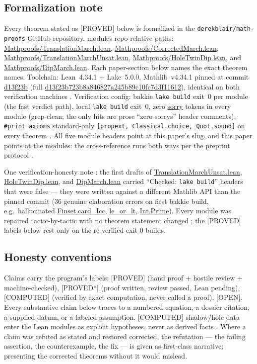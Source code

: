 \documentclass[11pt,a4paper]{article}
\theoremstyle{definition}
\begin{document}
\subsection{Formalization note}
\label{sec:formalization}

Every theorem stated as [PROVED] below is formalized in the
\texttt{derekblair/math-proofs} GitHub repository, modules
repo-relative paths:
\url{Mathproofs/TranslationMarch.lean},
\url{Mathproofs/CorrectedMarch.lean},
\url{Mathproofs/TranslationMarchUnsat.lean},
\url{Mathproofs/HoleTwinDip.lean}, and
\url{Mathproofs/DipMarch.lean}. Each paper-section below names the
exact theorem names. Toolchain: Lean~4.34.1 + Lake~5.0.0,
Mathlib~v4.34.1 pinned at commit \url{d13f23b}
(full \url{d13f23b723b8a846827a245b89c10fc7d3f11612}), identical on
both verification machines \cite{D246}. Verification config: bakkie
\texttt{lake build} exit~0 per module (the fast verdict path),
local \texttt{lake build} exit~0, zero \url{sorry} tokens in every
module (grep-clean; the only hits are prose ``zero sorrys'' header
comments), \texttt{\#print axioms} standard-only
\texttt{[propext, Classical.choice, Quot.sound]} on every theorem
\cite{D234,D246,D250,D262}. All five module headers point at this
paper's slug, and this paper points at the modules: the cross-reference
runs both ways per the preprint protocol \cite{D246}.

One verification-honesty note \cite{D246}: the first drafts of
\url{TranslationMarchUnsat.lean}, \url{HoleTwinDip.lean}, and
\url{DipMarch.lean} carried ``Checked: \texttt{lake build}''
headers that were false --- they were written against a different
Mathlib API than the pinned commit (36 genuine elaboration errors on
first bakkie build, e.g.\ hallucinated \url{Finset.card_Icc},
\url{le_or_lt}, \url{Int.Prime}). Every module was repaired
tactic-by-tactic with no theorem statement changed
\cite{D250,D258,D262}; the [PROVED] labels below rest only on the
re-verified exit-0 builds.

\subsection{Honesty conventions}

Claims carry the program's labels: [PROVED] (hand proof + hostile
review + machine-checked), [PROVED*] (proof written, review passed,
Lean pending), [COMPUTED] (verified by exact computation, never called
a proof), [OPEN]. Every substantive claim below traces to a numbered
equation, a dossier citation, a supplied datum, or a labeled
assumption. [COMPUTED] shadow/hole data enter the Lean modules as
explicit hypotheses, never as derived facts
\cite{D246,D250}. Where a claim was refuted as stated and restored
corrected, the refutation --- the failing assertion, the
counterexample, the fix --- is given as first-class narrative;
presenting the corrected theorems without it would mislead.
\end{document}
